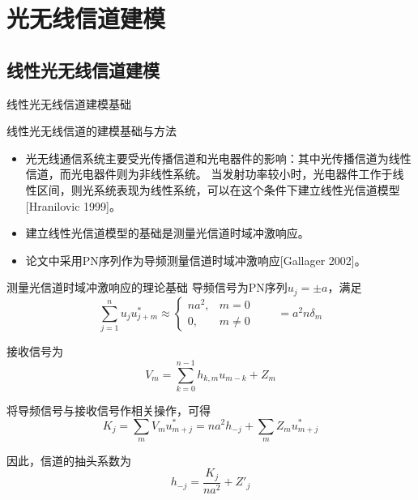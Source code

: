 \documentclass[mathserif, utf8, 9pt]{beamer}
\begin{document}
\section{光无线信道建模}
\subsection{线性光无线信道建模}
\begin{frame}{线性光无线信道建模基础}
\begin{block}{线性光无线信道的建模基础与方法}
\begin{itemize}
\item   光无线通信系统主要受光传播信道和光电器件的影响：其中光传播信道为线性信道，而光电器件则为非线性系统。
        \alert{当发射功率较小时，光电器件工作于线性区间，则光系统表现为线性系统，可以在这个条件下建立线性光信道模型[Hranilovic 1999]}。
\item   建立线性光信道模型的基础是测量光信道时域冲激响应。
\item   \alert{论文中采用PN序列作为导频测量信道时域冲激响应[Gallager 2002]}。
\end{itemize}
\end{block}
\end{frame}
\begin{frame}{测量光信道时域冲激响应的理论基础}
导频信号为PN序列$u_j=\pm a$，满足
\begin{equation}
    \sum_{j=1}^n u_j u^*_{j+m} \approx
    \begin{cases}
    	na^2,  & m=0 \\
    	0,     & m\neq 0
    \end{cases}
    \quad{}\quad{}
    = a^2 n \delta_m
\end{equation}

接收信号为
\begin{equation}
	V_m = \sum_{k=0}^{n-1}h_{k,m}u_{m-k} + Z_m
\end{equation}

将导频信号与接收信号作相关操作，可得
\begin{equation}
	K_j = \sum_mV_mu^*_{m+j} = na^2h_{-j} + \sum_m Z_mu^*_{m+j}
\end{equation}

因此，信道的抽头系数为
\begin{equation}
	h_{-j} = \frac{K_{j}}{na^2} + Z'_j
\end{equation}
\end{frame}
\end{document}
